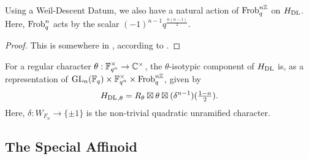 \documentclass[../main.tex]{subfiles}
\begin{document}
\begin{prop}
  Using a  Weil-Descent Datum, we also have a natural
  action of $\operatorname{Frob}_q^{n\mathbb{Z}}$ on $H_\mathrm{DL}$. Here, $\operatorname{Frob}_q^n$ acts by the scalar
  $(-1)^{n-1} q^{\frac{n(n-1)}2}$. 
  \begin{proof}
    This is somewhere in \cite{digne1985fonctions}, according to \cite[Lemma
    5.10]{mieda2016geometric}.
  \end{proof}
\end{prop}

\begin{thm}[]
  For a regular character $\theta: \mathbb{F}_{q^n}^\times \to \mathbb{C}^\times$, the 
  $\theta$-isotypic component of $H_\mathrm{DL}$ is, as a representation of 
  $\operatorname{GL}_n(\mathbb{F}_q) \times \mathbb{F}_{q^n}^\times \times \operatorname{Frob}_q^{n\mathbb{Z}}$, given by 
  \begin{equation*}
    {H_\mathrm{DL}}_{,\theta} = R_\theta \boxtimes \theta \boxtimes (\delta^{n-1})(\tfrac{1-n}2).
  \end{equation*}
  Here, $\delta: W_{F_n} \to \{\pm 1\}$ is the non-trivial quadratic unramified character.
\end{thm}


\subsection{The Special Affinoid} %
\label{sub:The Special Affinoid}
\begin{defi}
  \todo{}
\end{defi}

\end{document}

